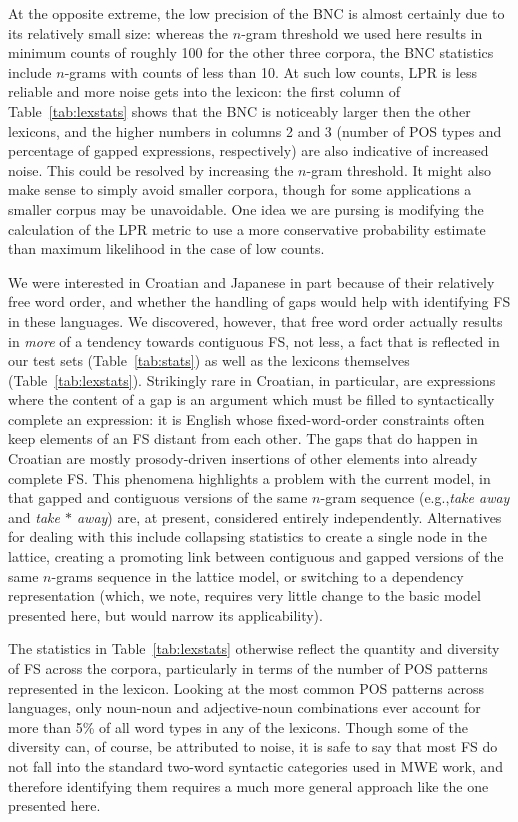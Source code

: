 \documentclass[11pt,letterpaper]{article}
\makeatletter
\def \eg {e.g.,\@ }
\newcommand{\gap}{$*$\xspace}
\newcommand{\ex}[1]{\textit{#1}\xspace}
\newcommand{\tabref}[2][]{Table#1~\ref{#2}\xspace}
\makeatother
\begin{document}
At the opposite extreme, the low precision of the BNC is almost certainly due to its relatively small size: whereas the $n$-gram threshold we used here results in minimum counts of roughly 100 for the other three corpora, the BNC statistics include $n$-grams with counts of less than 10. At such low counts, LPR is less reliable and more noise gets into the lexicon: the first column of \tabref{tab:lexstats} shows that the BNC is noticeably larger then the other lexicons, and the higher numbers in columns 2 and 3 (number of POS types and percentage of gapped expressions, respectively) are also indicative of increased noise.  This  could be resolved by increasing the $n$-gram threshold. It might also make sense to simply avoid smaller corpora, though for some applications a smaller corpus may be unavoidable. One idea we are pursing is modifying the calculation of the LPR metric to use a more conservative  probability estimate than maximum likelihood in the case of low counts.

We were interested in Croatian and Japanese in part because of their relatively free word order, and whether the handling of gaps would help with identifying FS in these languages. We discovered, however, that free word order actually results in \emph{more} of a tendency towards contiguous FS, not less, a fact that is reflected in our test sets (\tabref{tab:stats}) as well as the lexicons themselves (\tabref{tab:lexstats}). Strikingly rare in Croatian, in particular, are expressions where the content of a gap is an argument which must be filled to syntactically complete an expression: it is English whose fixed-word-order constraints often keep elements of an FS distant from each other. The gaps that do happen in Croatian are mostly prosody-driven insertions of other elements into already complete FS. This phenomena highlights a problem with the current model, in that gapped and contiguous versions of the same $n$-gram sequence (\eg \ex{take away} and \ex{take \gap away}) are, at present, considered entirely independently. Alternatives for dealing with this include collapsing statistics to create a single node in the lattice, creating a promoting link between contiguous and gapped versions of the same $n$-grams sequence in the lattice model, or switching to a dependency representation (which, we note, requires very little change to the basic model presented here, but would narrow its applicability). 


The statistics in \tabref{tab:lexstats} otherwise reflect the quantity and diversity of FS across the corpora, particularly in terms of the number of POS patterns represented in the lexicon. Looking at the most common POS patterns across languages, only noun-noun and adjective-noun combinations ever account for more than 5\% of all word types in any of the lexicons. Though some of the diversity can, of course, be attributed to noise, it is safe to say that most FS do not fall into the standard two-word syntactic categories used in MWE work, and therefore identifying them requires a much more general approach like the one presented here.
\end{document}
